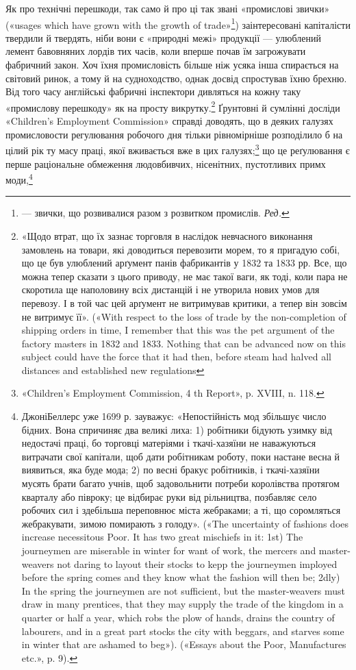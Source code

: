 Як про технічні перешкоди, так само й про ці так звані «промислові звички» («usages which have grown
with the growth of
trade»\footnote*{
— звички, що розвивалися разом з розвитком промислів. \emph{Ред.}
}) заінтересовані капіталісти твердили й твердять, ніби
вони є «природні межі» продукції — улюблений лемент бавовняних лордів тих часів, коли вперше почав
їм загрожувати фабричний закон. Хоч їхня промисловість більше ніж усяка інша
спирається на світовий ринок, а тому й на судноходство, однак
досвід спростував їхню брехню. Від того часу англійські фабричні
інспектори дивляться на кожну таку «промислову перешкоду»
як на просту викрутку.\footnote{
«Щодо втрат, що їх зазнає торговля в наслідок невчасного виконання замовлень на товари, які
доводиться перевозити морем, то я пригадую
собі, що це був улюблений арґумент панів фабрикантів у 1832 та 1833 рр.
Все, що можна тепер сказати з цього приводу, не має такої ваги, як тоді,
коли пара не скоротила ще наполовину всіх дистанцій і не утворила нових
умов для перевозу. І в той час цей арґумент не витримував критики, а
тепер він зовсім не витримує її». («With respect to the loss of trade by
the non-completion of shipping orders in time, I remember that this was
the pet argument of the factory masters in 1832 and 1833. Nothing that
can be advanced now on this subject could have the force that it had then,
before steam had halved all distances and established new regulations
} Ґрунтовні й сумлінні досліди «Children’s
Employment Commission» справді доводять, що в деяких
галузях промисловости регулювання робочого дня тільки рівномірніше розподілило б на цілий рік ту
масу праці, якої вживається вже в цих галузях;\footnote{
«Children’s Employment Commission, 4 th Report», p. XVIII,
n. 118.
} що це реґулювання є перше раціональне
обмеження людовбивчих, нісенітних, пустотливих примх моди,\footnote{
ДжоніБеллерс уже 1699 р. зауважує: «Непостійність мод збільшує
число бідних. Вона спричиняє два великі лиха: 1) робітники бідують
узимку від недостачі праці, бо торговці матеріями і ткачі-хазяїни не
наважуються витрачати свої капітали, щоб дати робітникам роботу, поки
настане весна й виявиться, яка буде мода; 2) по весні бракує робітників,
і ткачі-хазяїни мусять брати багато учнів, щоб задовольнити потреби
королівства протягом кварталу або півроку; це відбирає руки від рільництва, позбавляє село робочих
сил і здебільша переповнює міста жебраками; а ті, що соромляться жебракувати, зимою помирають з
голоду».
(«The uncertainty of fashions does increase necessitous Poor. It has two
great mischiefs in it: 1st) The journeymen are miserable in winter for want
of work, the mercers and master-weavers not daring to layout their stocks
to kepp the journeymen imployed before the spring comes and they know
what the fashion will then be; 2dly) In the spring the journeymen are
not sufficient, but the master-weavers must draw in many prentices, that
they may supply the trade of the kingdom in a quarter or half a year, which
robs the plow of hands, drains the country of labourers, and in a great part
stocks the city with beggars, and starves some in winter that are ashamed
to beg»). («Essays about the Poor, Manufactures etc.», p. 9).
}
